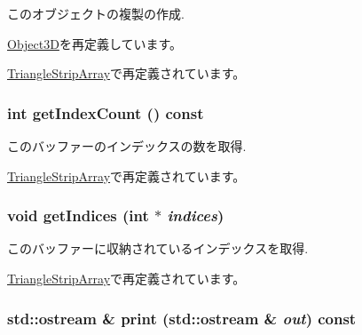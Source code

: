 このオブジェクトの複製の作成. 

\hyperlink{classm3g_1_1Object3D_a25110dac934f867b83b73ad4741a0f4}{Object3D}を再定義しています。

\hyperlink{classm3g_1_1TriangleStripArray_1623fbdfe91eb2e9d4a67bece6a46904}{TriangleStripArray}で再定義されています。\hypertarget{classm3g_1_1IndexBuffer_fe9ae2993ebcdb93d5ff26d57c81b73e}{
\subsubsection[{getIndexCount}]{\setlength{\rightskip}{0pt plus 5cm}int getIndexCount () const}}
\label{classm3g_1_1IndexBuffer_fe9ae2993ebcdb93d5ff26d57c81b73e}


このバッファーのインデックスの数を取得. 

\hyperlink{classm3g_1_1TriangleStripArray_fe9ae2993ebcdb93d5ff26d57c81b73e}{TriangleStripArray}で再定義されています。\hypertarget{classm3g_1_1IndexBuffer_650953afac45099025a524ab160b911f}{
\subsubsection[{getIndices}]{\setlength{\rightskip}{0pt plus 5cm}void getIndices (int $\ast$ {\em indices})}}
\label{classm3g_1_1IndexBuffer_650953afac45099025a524ab160b911f}


このバッファーに収納されているインデックスを取得. 

\hyperlink{classm3g_1_1TriangleStripArray_650953afac45099025a524ab160b911f}{TriangleStripArray}で再定義されています。\hypertarget{classm3g_1_1IndexBuffer_6fea17fa1532df3794f8cb39cb4f911f}{
\subsubsection[{print}]{\setlength{\rightskip}{0pt plus 5cm}std::ostream \& print (std::ostream \& {\em out}) const}}
\label{classm3g_1_1IndexBuffer_6fea17fa1532df3794f8cb39cb4f911f}


